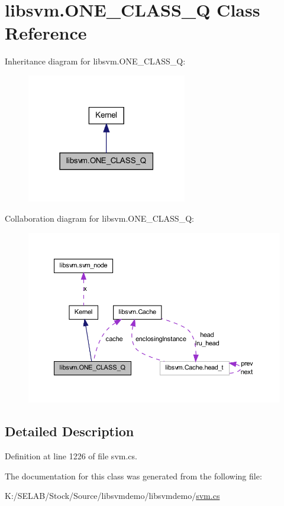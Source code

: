 \hypertarget{classlibsvm_1_1_o_n_e___c_l_a_s_s___q}{
\section{libsvm.ONE\_\-CLASS\_\-Q Class Reference}
\label{classlibsvm_1_1_o_n_e___c_l_a_s_s___q}
}


Inheritance diagram for libsvm.ONE\_\-CLASS\_\-Q:
\nopagebreak
\begin{figure}[H]
\begin{center}
\leavevmode
\includegraphics[width=198pt]{classlibsvm_1_1_o_n_e___c_l_a_s_s___q__inherit__graph}
\end{center}
\end{figure}


Collaboration diagram for libsvm.ONE\_\-CLASS\_\-Q:
\nopagebreak
\begin{figure}[H]
\begin{center}
\leavevmode
\includegraphics[width=386pt]{classlibsvm_1_1_o_n_e___c_l_a_s_s___q__coll__graph}
\end{center}
\end{figure}


\subsection{Detailed Description}


Definition at line 1226 of file svm.cs.



The documentation for this class was generated from the following file:\begin{DoxyCompactItemize}
\item 
K:/SELAB/Stock/Source/libsvmdemo/libsvmdemo/\hyperlink{svm_8cs}{svm.cs}\end{DoxyCompactItemize}
